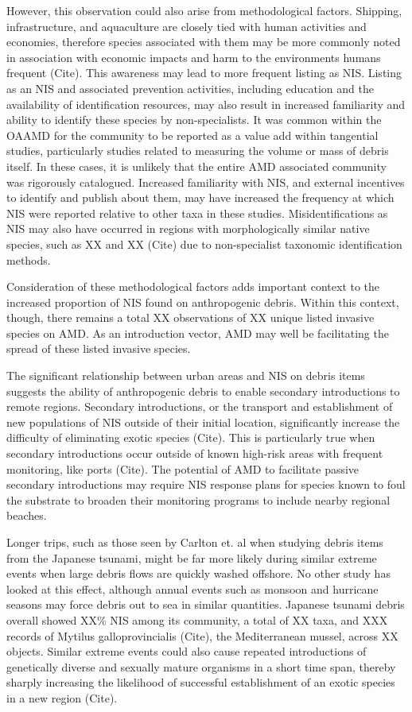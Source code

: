 \documentclass[a4paper, nobind]{templates/ociamthesis}
\begin{document}
However, this observation could also arise from methodological factors. Shipping, infrastructure, and aquaculture are closely tied with human activities and economies, therefore species associated with them may be more commonly noted in association with economic impacts and harm to the environments humans frequent (Cite). This awareness may lead to more frequent listing as NIS. Listing as an NIS and associated prevention activities, including education and the availability of identification resources, may also result in increased familiarity and ability to identify these species by non-specialists.
It was common within the OAAMD for the community to be reported as a value add within tangential studies, particularly studies related to measuring the volume or mass of debris itself. In these cases, it is unlikely that the entire AMD associated community was rigorously catalogued. Increased familiarity with NIS, and external incentives to identify and publish about them, may have increased the frequency at which NIS were reported relative to other taxa in these studies. Misidentifications as NIS may also have occurred in regions with morphologically similar native species, such as XX and XX (Cite) due to non-specialist taxonomic identification methods.

Consideration of these methodological factors adds important context to the increased proportion of NIS found on anthropogenic debris. Within this context, though, there remains a total XX observations of XX unique listed invasive species on AMD. As an introduction vector, AMD may well be facilitating the spread of these listed invasive species.

The significant relationship between urban areas and NIS on debris items suggests the ability of anthropogenic debris to enable secondary introductions to remote regions. Secondary introductions, or the transport and establishment of new populations of NIS outside of their initial location, significantly increase the difficulty of eliminating exotic species (Cite). This is particularly true when secondary introductions occur outside of known high-risk areas with frequent monitoring, like ports (Cite). The potential of AMD to facilitate passive secondary introductions may require NIS response plans for species known to foul the substrate to broaden their monitoring programs to include nearby regional beaches.

Longer trips, such as those seen by Carlton et. al when studying debris items from the Japanese tsunami, might be far more likely during similar extreme events when large debris flows are quickly washed offshore. No other study has looked at this effect, although annual events such as monsoon and hurricane seasons may force debris out to sea in similar quantities. Japanese tsunami debris overall showed XX\% NIS among its community, a total of XX taxa, and XXX records of Mytilus galloprovincialis (Cite), the Mediterranean mussel, across XX objects. Similar extreme events could also cause repeated introductions of genetically diverse and sexually mature organisms in a short time span, thereby sharply increasing the likelihood of successful establishment of an exotic species in a new region (Cite).
\end{document}
